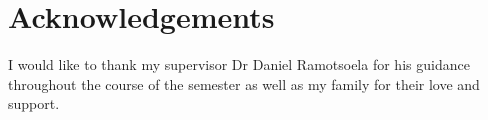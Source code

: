 \section{Acknowledgements}

I would like to thank my supervisor Dr Daniel Ramotsoela for his guidance throughout the course of the semester as well as my family for their love and support.